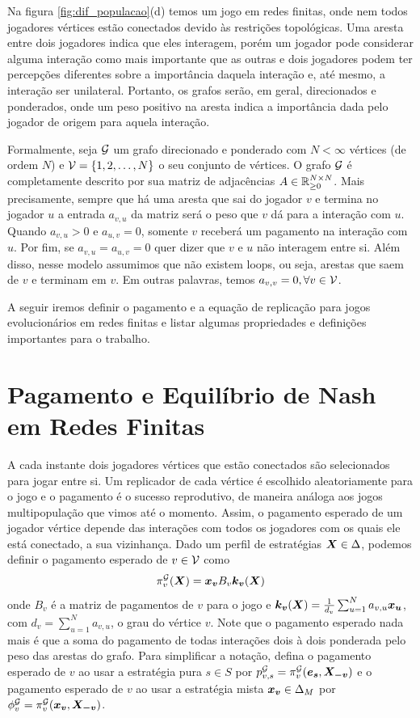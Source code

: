 Na figura \ref{fig:dif_populacao}(d) temos um jogo em redes finitas, onde nem todos jogadores vértices estão conectados devido às restrições topológicas. Uma aresta entre dois jogadores indica que eles interagem, porém um jogador pode considerar alguma interação como mais importante que as outras e dois jogadores podem ter percepções diferentes sobre a importância daquela interação e, até mesmo, a interação ser unilateral. Portanto, os grafos serão, em geral, direcionados e ponderados, onde um peso positivo na aresta indica a importância dada pelo jogador de origem para aquela interação.

Formalmente, seja $\mathcal{G}$ um grafo direcionado e ponderado com $N<\infty$ vértices (de ordem $N$) e $\mathcal{V}=\{1,2,\dots,N\}$ o seu conjunto de vértices. O grafo $\mathcal{G}$ é completamente descrito por sua matriz de adjacências $A\in\mathbb{R}^{N\times N}_{\geq0}$. Mais precisamente, sempre que há uma aresta que sai do jogador $v$ e termina no jogador $u$ a entrada $a_{v,u}$ da matriz será o peso que $v$ dá para a interação com $u$. Quando $a_{v,u}>0$ e $a_{u,v}=0$, somente $v$ receberá um pagamento na interação com $u$. Por fim, se $a_{v,u}=a_{u,v}=0$ quer dizer que $v$ e $u$ não interagem entre si. Além disso, nesse modelo assumimos que não existem loops, ou seja, arestas que saem de $v$ e terminam em $v$. Em outras palavras, temos $a_{v,v}=0, \forall v\in\mathcal{V}$.

A seguir iremos definir o pagamento e a equação de replicação para jogos evolucionários em redes finitas e listar algumas propriedades e definições importantes para o trabalho.


\section{Pagamento e Equilíbrio de Nash em Redes Finitas}

A cada instante dois jogadores vértices que estão conectados são selecionados para jogar entre si. Um replicador de cada vértice é escolhido aleatoriamente para o jogo e o pagamento é o sucesso reprodutivo, de maneira análoga aos jogos multipopulação que vimos até o momento. Assim, o pagamento esperado de um jogador vértice depende das interações com todos os jogadores com os quais ele está conectado, a sua vizinhança. Dado um perfil de estratégias $\boldsymbol{X}\in\Delta$, podemos definir o pagamento esperado de $v\in\mathcal{V}$ como
\begin{equation}
    \label{pagtoWS}
    \pi^{\mathcal{G}}_v(\boldsymbol{X})= \boldsymbol{x_v} B_v \boldsymbol{k_v}(\boldsymbol{X})
\end{equation}
onde $B_v$ é a matriz de pagamentos de $v$ para o jogo e $\boldsymbol{k_v}(\boldsymbol{X})=\frac{1}{d_v}\sum^N_{u=1} a_{v,u} \boldsymbol{x_u}$, com $d_v=\sum^N_{u=1} a_{v,u}$, o grau do vértice $v$. Note que o pagamento esperado nada mais é que a soma do pagamento de todas interações dois à dois ponderada pelo peso das arestas do grafo. Para simplificar a notação, defina o pagamento esperado de $v$ ao usar a estratégia pura $s\in S$ por $p^{\mathcal{G}}_{v,s}=\pi^{\mathcal{G}}_v(\boldsymbol{e_s},\boldsymbol{X_{-v}})$ e o pagamento esperado de $v$ ao usar a estratégia mista $\boldsymbol{x_v}\in\Delta_M$ por $\phi^{\mathcal{G}}_v=\pi^{\mathcal{G}}_v(\boldsymbol{x_v},\boldsymbol{X_{-v}})$. 

